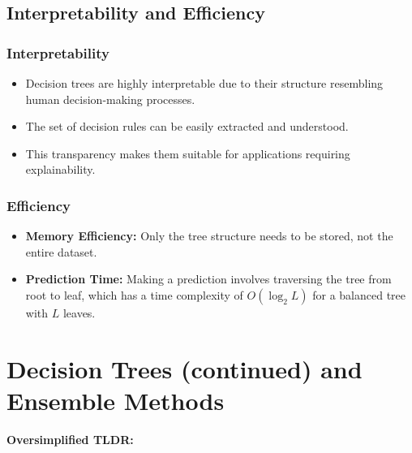 \documentclass{article}
\begin{document}
\subsection{Interpretability and Efficiency}

\subsubsection{Interpretability}

\begin{itemize}
    \item Decision trees are highly interpretable due to their structure resembling human decision-making processes.
    \item The set of decision rules can be easily extracted and understood.
    \item This transparency makes them suitable for applications requiring explainability.
\end{itemize}

\subsubsection{Efficiency}

\begin{itemize}
    \item \textbf{Memory Efficiency:} Only the tree structure needs to be stored, not the entire dataset.
    \item \textbf{Prediction Time:} Making a prediction involves traversing the tree from root to leaf, which has a time complexity of $O(\log_2 L)$ for a balanced tree with $L$ leaves.
\end{itemize}

\section{Decision Trees (continued) and Ensemble Methods}

\textbf{Oversimplified TLDR:}
\end{document}
